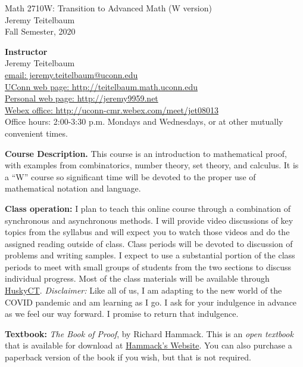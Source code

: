 \documentclass[12pt]{article}
\begin{document}
\begin{center} Math 2710W: Transition to Advanced Math (W version)\\
Jeremy Teitelbaum \\ Fall Semester, 2020
\end{center}

{\bf Instructor}\\
Jeremy Teitelbaum \\
\href{mailto:jeremy.teitelbaum@uconn.edu}{email: jeremy.teitelbaum@uconn.edu} \\
\href{http://teitelbaum.math.uconn.edu}{UConn web page: http://teitelbaum.math.uconn.edu} \\
\href{http://jeremy9959.net}{Personal web page: http://jeremy9959.net} \\
\href{http://uconn-cmr.webex.com/meet/jet08013}{Webex office: http://uconn-cmr.webex.com/meet/jet08013} \\
Office hours: 2:00-3:30 p.m. Mondays and Wednesdays, or at other mutually convenient times.  

{\bf Course Description.} This course is an introduction to mathematical proof, with examples from
combinatorics, number theory, set theory, and calculus.  It is a ``W'' course so significant time
will be devoted to the proper use of mathematical notation and language.

{\bf Class operation:} I plan to teach this online course through a combination of synchronous and asynchronous
methods.  I will provide video discussions of key topics from the syllabus and will expect you to watch those
videos and do the assigned reading outside of class.  Class periods will be devoted to discussion of problems
and writing samples.  I expect to use a substantial portion of the class periods to meet with small groups
of students from the two sections to discuss individual progress.  Most of the class materials
will be available through \href{http://huskyct.uconn.edu}{HuskyCT}.   {\it Disclaimer:} Like all of us,
I am adapting to the new world of the COVID pandemic and am learning as I go.  I ask for your indulgence
in advance as we feel our way forward.  I promise to return that indulgence.   

{\bf Textbook:} {\it The Book of Proof}, by Richard Hammack.  This is an {\it open textbook} that is available
for download at \href{https://www.people.vcu.edu/~rhammack/BookOfProof}{Hammack's Website}. You can also purchase a paperback
version of the book if you wish, but that is not required. 
\end{document}
